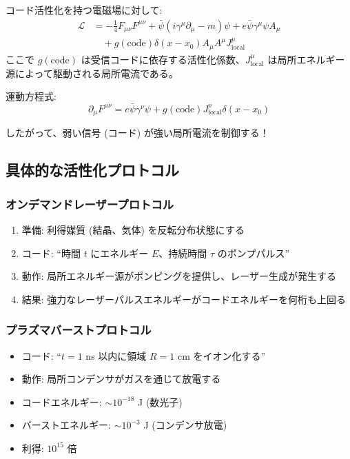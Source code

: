 \documentclass[11pt,a4paper]{article}
\begin{document}
	コード活性化を持つ電磁場に対して:
	\begin{align}
		\mathcal{L} &= -\frac{1}{4} F_{\mu\nu} F^{\mu\nu} + \bar{\psi}(i\gamma^\mu\partial_\mu - m)\psi + e\bar{\psi}\gamma^\mu\psi A_\mu \\
		&\quad + g(\text{code}) \delta(x - x_0) A_\mu A^\mu J_{\text{local}}^\mu
	\end{align}
	ここで $g(\text{code})$ は受信コードに依存する活性化係数、$J_{\text{local}}^\mu$ は局所エネルギー源によって駆動される局所電流である。
	
	運動方程式:
	\begin{equation}
		\partial_\mu F^{\mu\nu} = e\bar{\psi}\gamma^\nu\psi + g(\text{code}) J_{\text{local}}^\nu \delta(x - x_0)
	\end{equation}
	
	したがって、弱い信号 (コード) が強い局所電流を制御する！
	
	\subsection{具体的な活性化プロトコル}
	
	\subsubsection{オンデマンドレーザープロトコル}
	\begin{enumerate}
		\item 準備: 利得媒質 (結晶、気体) を反転分布状態にする
		\item コード: ``時間 $t$ にエネルギー $E$、持続時間 $\tau$ のポンプパルス''
		\item 動作: 局所エネルギー源がポンピングを提供し、レーザー生成が発生する
		\item 結果: 強力なレーザーパルスエネルギーがコードエネルギーを何桁も上回る
	\end{enumerate}
	
	\subsubsection{プラズマバーストプロトコル}
	\begin{itemize}
		\item コード: ``$t=1$ ns 以内に領域 $R=1$ cm をイオン化する''
		\item 動作: 局所コンデンサがガスを通じて放電する
		\item コードエネルギー: $\sim 10^{-18}$ J (数光子)
		\item バーストエネルギー: $\sim 10^{-3}$ J (コンデンサ放電)
		\item 利得: $10^{15}$ 倍
	\end{itemize}
	
\end{document}
